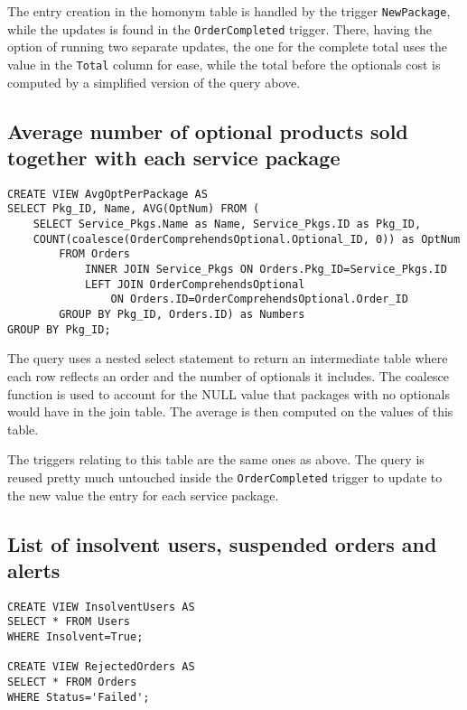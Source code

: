 The entry creation in the homonym table is handled by the trigger \texttt{NewPackage}, while the updates is found in the \texttt{OrderCompleted} trigger. There, having the option of running two separate updates, the one for the complete total uses the value in the \texttt{Total} column for ease, while the total before the optionals cost is computed by a simplified version of the query above.

\subsection{Average number of optional products sold together with each service package}

\begin{lstlisting}[style=SQL]
CREATE VIEW AvgOptPerPackage AS
SELECT Pkg_ID, Name, AVG(OptNum) FROM (
    SELECT Service_Pkgs.Name as Name, Service_Pkgs.ID as Pkg_ID,
    COUNT(coalesce(OrderComprehendsOptional.Optional_ID, 0)) as OptNum
        FROM Orders
            INNER JOIN Service_Pkgs ON Orders.Pkg_ID=Service_Pkgs.ID
            LEFT JOIN OrderComprehendsOptional
                ON Orders.ID=OrderComprehendsOptional.Order_ID
        GROUP BY Pkg_ID, Orders.ID) as Numbers
GROUP BY Pkg_ID;

\end{lstlisting}

The query uses a nested select statement to return an intermediate table where each row reflects an order and the number of optionals it includes.
The coalesce function is used to account for the NULL value that packages with no optionals would have in the join table. The average is then computed on the values of this table.

The triggers relating to this table are the same ones as above. The query is reused pretty much untouched inside the \texttt{OrderCompleted}
trigger to update to the new value the entry for each service package.

\subsection{List of insolvent users, suspended orders and alerts}

\begin{lstlisting}[style=SQL]
CREATE VIEW InsolventUsers AS
SELECT * FROM Users
WHERE Insolvent=True;

CREATE VIEW RejectedOrders AS
SELECT * FROM Orders
WHERE Status='Failed';
\end{lstlisting}

